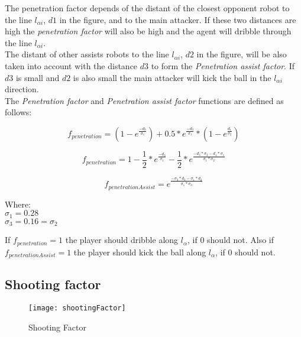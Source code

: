 \documentclass[
10pt, %
a4paper, %
oneside, %
headinclude,footinclude, %
BCOR5mm, %
]{scrartcl}
\begin{document}
The penetration factor depends of the distant of the closest opponent robot to the line $l_{\alpha i}$, $d1$ in the figure, and to the main attacker. If these two distances are high the \textit{penetration factor} will also be high and the agent will dribble through the line $l_{\alpha i}$.\\

The distant of other assists robots to the line $l_{\alpha i}$, $d2$ in the figure, will be also taken into account with the distance $d3$ to form the \textit{Penetration assist factor}. If $d3$ is small and $d2$ is also small the main attacker will kick the ball in the $l_{\alpha i}$ direction. \\

The \textit{Penetration factor} and \textit{Penetration assist factor} functions are defined as follows:

\begin{equation}
	f_{penetration} = (1 - e^{\frac{-d_3}{\sigma_1}}) + 0.5*e^{\frac{-d_3}{\sigma_1}}*(1 - e^{\frac{d_1}{\sigma_2}}) 
\end{equation}

\begin{equation}
	f_{penetration} = 1 - \frac{1}{2} * e^{\frac{-d_3}{\sigma_1}} - \frac{1}{2} * e^{\frac{-d_3*\sigma_2 - d_1*\sigma_1}{\sigma_1 * \sigma_2}}
\end{equation}

\begin{equation}
	f_{penetrationAssist} = e^{\frac{-\sigma_3*d_3 - \sigma_1*d_2}{\sigma_1*\sigma_3}}
\end{equation}

Where:\\
 $\sigma_1 = 0.28$\\
 $\sigma_3 = 0.16= \sigma_2$
 
If $f_{penetration} = 1$ the player should dribble along $l_{\alpha}$, if $0$ should not. Also if $f_{penetrationAssist} = 1$ the player should kick the ball along $l_{\alpha}$, if $0$ should not.

\subsection{Shooting factor}

\begin{figure}
	\centering
	\texttt{[image: shootingFactor]}
	\caption{Shooting Factor}
	\label{fig:fig}
\end{figure}
\end{document}
